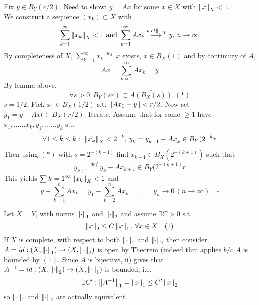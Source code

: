 \begin{pf}{}{}
	Fix $y\in B_Y(r/2)$. Need to show: $y=Ax$ for some $x\in X$ with $\left\|{x}\right\|_X<1.$\\
	We construct a sequence $(x_k)\subset X$ with
	$$
		\sum_{k=1}^\infty \left\|{x_k}\right\|_X<1\,\,\text{and}\,\,\sum_{k=1}^\infty Ax_k\stackrel{wrt\left\|{\cdot}\right\|_Y}{\longrightarrow{}}y,\,n\to\infty
	$$
	By completeness of $X$, $\sum_{k=1}^\infty x_k\stackrel{def.}{=}x$ exists, $x\in B_X(1)$ and by continuity of $A$,
	$$Ax=\sum_{k=1}^\infty Ax_k=y$$
	By lemma above,
	$$\forall s>0, B_Y(sr)\subset \overline{A(B_X(s))}\,\,(*)$$
	$s=1/2$. Pick $x_1\in B_X(1/2)$ s.t. $\left\|{Ax_1-y}\right\|<r/2$. Now set $y_1=y-Ax(\in B_X(r/2)$. Iterate. Assume that for some $\geq 1$ have $x_1,......x_k,y_1,......y_k$ s.t.
	$$
		\forall 1\leq\tilde{k}\leq k:\,\,\left\|{\tilde{x_k}}\right\|_X<2^{-k},\,y_{\tilde{k}}=y_{\tilde{k}-1}-Ax_{\tilde{k}}\in B_Y(2^{-\tilde{k}}r
	$$
	Then using $(*)$ with $s=2^{-(k+1)}$ find $x_{k+1}\in B_X(2^{-(k+1)})$ such that
	$$
		y_{k+1}\stackrel{def}{=}y_k-Ax_{k+1}\in B_Y(2^{-(k+1)}r
	$$
	This yields $\sum{k=1}^{\infty}\left\|{x_k}\right\|_X<1$ and
	$$
		y-\sum_{k=1}^n Ax_k=y_1-\sum_{k=2}^n Ax_k=...=y_n\to0\,(n\to \infty)\quad\square
	$$
\end{pf}

\begin{example}\label{Equinorm}\nl
	Let $X=Y$, with norms $\left\|{\cdot}\right\|_1$ and $\left\|{\cdot}\right\|_2$ and assume $\exists C>0$ s.t. $$\left\|{x}\right\|_2\leq C\left\|{x}\right\|_1,\,\forall x\in X\quad(1)$$
	If $X$ is complete, with respect to both $\left\|{\cdot}\right\|_1$ and $\left\|{\cdot}\right\|_2$ then consider $A=id:(X,\left\|{\cdot}\right\|_1)\to(X,\left\|{\cdot}\right\|_2)$ is open by Theorem (indeed thm applies $b/c$ $A$ is bounded by $(1)$. Since $A$ is bijective, ii) gives that $A^{-1}=id:(X,\left\|{\cdot}\right\|_2)\to(X,\left\|{\cdot}\right\|_1)$ is bounded, i.e.
	$$
		\exists C': \left\|{A^{-1}}\right\|_1=\left\|{x}\right\|_1\leq C'\left\|{x}\right\|_2
	$$
	so $\left\|{\cdot}\right\|_1$ and $\left\|{\cdot}\right\|_2$ are actually equivalent.
\end{example}

